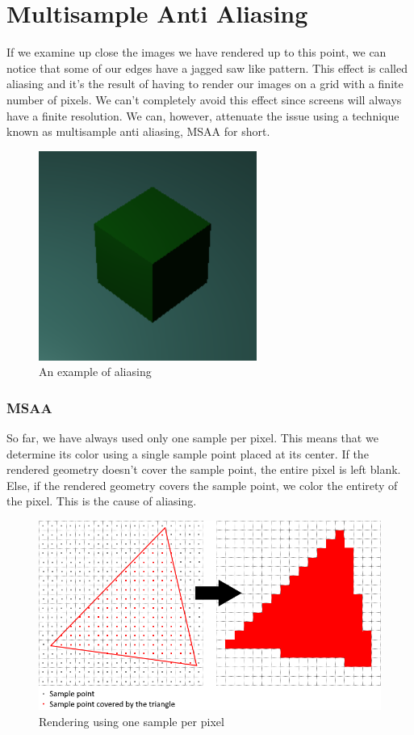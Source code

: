 \chapter{Multisample Anti Aliasing}

If we examine up close the images we have rendered up to this point, we
can notice that some of our edges have a jagged saw like pattern.
This effect is called aliasing and it's the result of having to render our
images on a grid with a finite number of pixels.
We can't completely avoid this effect since screens will always have a
finite resolution.
We can, however, attenuate the issue using a technique known as multisample
anti aliasing, MSAA for short.

\begin{figure}[H]
    \centering
    \includegraphics[scale=1.0]{images/ChMSAA/AnExampleOfAliasing.png}
    \caption{An example of aliasing}
    \label{fig::AliasingExample}
\end{figure}

\subsection{MSAA}

So far, we have always used only one sample per pixel.
This means that we determine its color using a single sample
point placed at its center.
If the rendered geometry doesn't cover the sample point, the entire pixel
is left blank.
Else, if the rendered geometry covers the sample point, we color the entirety of
the pixel.
This is the cause of aliasing.

\begin{figure}[H]
    \centering
    \includegraphics[scale=0.6]{images/ChMSAA/OneSamplePerPixel.png}
    \caption{Rendering using one sample per pixel}
    \label{fig::OneSamplePerPixel}
\end{figure}

